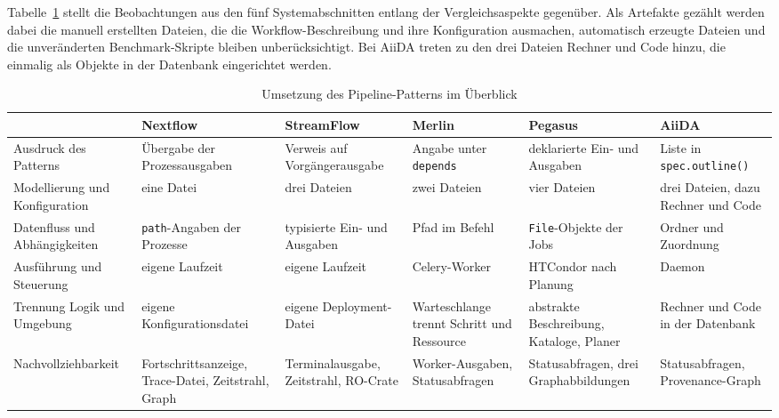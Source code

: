 Tabelle~\ref{tab:pipe:vergleich} stellt die Beobachtungen aus den
fünf Systemabschnitten entlang der Vergleichsaspekte gegenüber. Als
Artefakte gezählt werden dabei die manuell erstellten Dateien, die
die Workflow-Beschreibung und ihre Konfiguration ausmachen,
automatisch erzeugte Dateien und die unveränderten Benchmark-Skripte
bleiben unberücksichtigt. Bei AiiDA treten zu den drei Dateien
Rechner und Code hinzu, die einmalig als Objekte in der Datenbank
eingerichtet werden.

\begin{table}[H]
  \caption{Umsetzung des Pipeline-Patterns im Überblick}
  \label{tab:pipe:vergleich}
  \centering
  \scriptsize
  \setlength{\tabcolsep}{3pt}
  \renewcommand{\arraystretch}{1.4}
  \begin{tabular}{>{\raggedright\arraybackslash}p{2.7cm} >{\raggedright\arraybackslash}p{1.9cm} >{\raggedright\arraybackslash}p{1.9cm} >{\raggedright\arraybackslash}p{1.9cm} >{\raggedright\arraybackslash}p{1.9cm} >{\raggedright\arraybackslash}p{1.9cm}}
    \hline
     & \textbf{Nextflow} & \textbf{Stream\-Flow} & \textbf{Merlin} & \textbf{Pegasus} & \textbf{AiiDA} \\
    \hline
    Ausdruck des Patterns & Übergabe der Prozess\-ausgaben & Verweis auf Vorgänger\-ausgabe & Angabe unter \texttt{depends} & deklarierte Ein- und Ausgaben & Liste in \texttt{spec.outline()} \\
    Modellierung und Konfiguration & eine Datei & drei Dateien & zwei Dateien & vier Dateien & drei Dateien, dazu Rechner und Code \\
    Datenfluss und Abhängigkeiten & \texttt{path}-Angaben der Prozesse & typisierte Ein- und Ausgaben & Pfad im Befehl & \texttt{File}-Objekte der Jobs & Ordner und Zuordnung \\
    Ausführung und Steuerung & eigene Laufzeit & eigene Laufzeit & Celery-Worker & HTCondor nach Planung & Daemon \\
    Trennung Logik und Umgebung & eigene Konfigu\-rationsdatei & eigene Deployment-Datei & Warteschlange trennt Schritt und Ressource & abstrakte Beschreibung, Kataloge, Planer & Rechner und Code in der Datenbank \\
    Nachvollziehbarkeit & Fortschritts\-anzeige, Trace-Datei, Zeitstrahl, Graph & Terminal\-ausgabe, Zeitstrahl, RO-Crate & Worker-Ausgaben, Status\-abfragen & Status\-abfragen, drei Graph\-abbildungen & Status\-abfragen, Provenance-Graph \\
    \hline
  \end{tabular}
\end{table}

